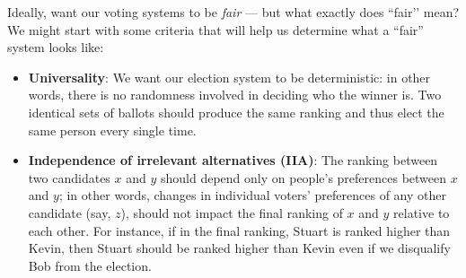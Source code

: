 \documentclass{article}
\begin{document}
Ideally, want our voting systems to be \textit{fair} --- but what exactly does ``fair’’ mean? We might start with some criteria that will help us determine what a ``fair” system looks like:
\begin{itemize}
	\item \textbf{Universality}: We want our election system to be deterministic: in other words, there is no randomness involved in deciding who the winner is. Two identical sets of ballots should produce the same ranking and thus elect the same person every single time. 
	\item \textbf{Independence of irrelevant alternatives (IIA)}: The ranking between two candidates $x$ and $y$ should depend only on people’s preferences between $x$ and $y$; in other words, changes in individual voters’ preferences of any other candidate (say, $z$), should not impact the final ranking of $x$ and $y$ relative to each other. 
	For instance, if in the final ranking, Stuart is ranked higher than Kevin, then Stuart should be ranked higher than Kevin even if we disqualify Bob from the election. 
	

\end{itemize}
\end{document}
